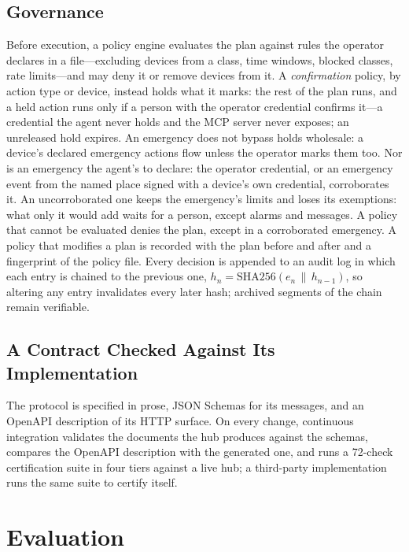\documentclass[conference]{IEEEtran}
\begin{document}
\subsection{Governance}
Before execution, a policy engine evaluates the plan against rules the operator declares in a file---excluding devices from a class, time windows, blocked classes, rate limits---and may deny it or remove devices from it. A \emph{confirmation} policy, by action type or device, instead holds what it marks: the rest of the plan runs, and a held action runs only if a person with the operator credential confirms it---a credential the agent never holds and the MCP server never exposes; an unreleased hold expires. An emergency does not bypass holds wholesale: a device's declared emergency actions flow unless the operator marks them too. Nor is an emergency the agent's to declare: the operator credential, or an emergency event from the named place signed with a device's own credential, corroborates it. An uncorroborated one keeps the emergency's limits and loses its exemptions: what only it would add waits for a person, except alarms and messages. A policy that cannot be evaluated denies the plan, except in a corroborated emergency. A policy that modifies a plan is recorded with the plan before and after and a fingerprint of the policy file. Every decision is appended to an audit log in which each entry is chained to the previous one, $h_n = \mathrm{SHA256}(e_n \,\|\, h_{n-1})$, so altering any entry invalidates every later hash; archived segments of the chain remain verifiable.

\subsection{A Contract Checked Against Its Implementation}
The protocol is specified in prose, JSON Schemas for its messages, and an OpenAPI description of its HTTP surface. On every change, continuous integration validates the documents the hub produces against the schemas, compares the OpenAPI description with the generated one, and runs a 72-check certification suite in four tiers against a live hub; a third-party implementation runs the same suite to certify itself.

\section{Evaluation}
\label{sec:eval}
\end{document}
